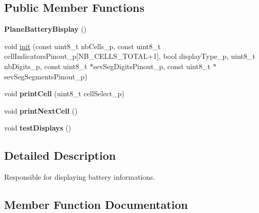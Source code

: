 \subsection*{Public Member Functions}
\begin{DoxyCompactItemize}
\item 
\mbox{\label{class_plane_battery_display_a7e814eae4e900d05fbf0e70302c5f788}} 
{\bfseries Plane\+Battery\+Bisplay} ()
\item 
void \hyperlink{class_plane_battery_display_ab73951d7985ac8f9f1ff749834d6cb0d}{init} (const uint8\+\_\+t nb\+Cells\+\_\+p, const uint8\+\_\+t cell\+Indicators\+Pinout\+\_\+p\mbox{[}N\+B\+\_\+\+C\+E\+L\+L\+S\+\_\+\+T\+O\+T\+AL+1\mbox{]}, bool display\+Type\+\_\+p, uint8\+\_\+t nb\+Digits\+\_\+p, const uint8\+\_\+t $\ast$sev\+Seg\+Digits\+Pinout\+\_\+p, const uint8\+\_\+t $\ast$sev\+Seg\+Segments\+Pinout\+\_\+p)
\item 
\mbox{\label{class_plane_battery_display_ae0bf4ee2c129b48e04956a72ae342b45}} 
void {\bfseries print\+Cell} (uint8\+\_\+t cell\+Select\+\_\+p)
\item 
\mbox{\label{class_plane_battery_display_aed5ad4b64a8182ffe3d17507afdd702b}} 
void {\bfseries print\+Next\+Cell} ()
\item 
\mbox{\label{class_plane_battery_display_a357a9c5615a9f176ea1ecf7e37c79bbd}} 
void {\bfseries test\+Displays} ()
\end{DoxyCompactItemize}


\subsection{Detailed Description}
Responsible for displaying battery informations. 

\subsection{Member Function Documentation}
\mbox{\label{class_plane_battery_display_ab73951d7985ac8f9f1ff749834d6cb0d}} 
